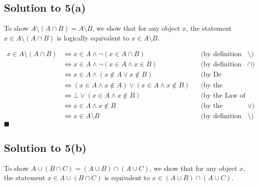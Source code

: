 \documentclass{scrartcl}
\begin{document}
    \subsection*{Solution to 5(a)}
    To show $A \setminus (A \cap B) = A \setminus B$, we show that for any object $x$, the statement $x \in A \setminus (A \cap B)$ is logically equivalent to $x \in A \setminus B$.

    \begin{align*}
        x \in A \setminus (A \cap B) 
        &\Leftrightarrow x \in A \wedge \neg (x \in A \cap B) 
        && \text{(by definition of $\setminus$)} \\
        &\Leftrightarrow x \in A \wedge \neg (x \in A \wedge x \in B)
        && \text{(by definition of $\cap$)} \\
        &\Leftrightarrow x \in A \wedge (x \notin A \vee x \notin B)
        && \text{(by De Morgan's Law)} \\
        &\Leftrightarrow (x \in A \wedge x \notin A) \vee (x \in A \wedge x \notin B)
        && \text{(by the Distributive Law)} \\
        &\Leftrightarrow \bot \vee (x \in A \wedge x \notin B)
        && \text{(by the Law of Contradiction)} \\
        &\Leftrightarrow x \in A \wedge x \notin B
        && \text{(by the Identity Law for $\vee$)} \\
        &\Leftrightarrow x \in A \setminus B
        && \text{(by definition of $\setminus$)}
    \end{align*}
    \hfill $\blacksquare$


    \subsection*{Solution to 5(b)}
    To show $A \cup (B \cap C) = (A \cup B) \cap (A \cup C)$, we show that for any object $x$, the statement $x \in A \cup (B \cap C)$ is equivalent to $x \in (A \cup B) \cap (A \cup C)$.
\end{document}
